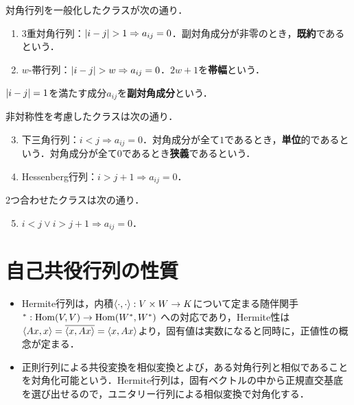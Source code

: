\documentclass[uplatex, dvipdfmx]{jsreport}
\begin{document}
\begin{definition}
    対角行列を一般化したクラスが次の通り．
    \begin{enumerate}
        \item 3重対角行列：$\lvert i-j\rvert>1\Rightarrow a_{ij}=0$．副対角成分が非零のとき，\textbf{既約}であるという．
        \item $w$-帯行列：$\lvert i-j\rvert>w\Rightarrow a_{ij}=0$．$2w+1$を\textbf{帯幅}という．
    \end{enumerate}
    $\lvert i-j\rvert=1$を満たす成分$a_{ij}$を\textbf{副対角成分}という．

    非対称性を考慮したクラスは次の通り．
    \begin{enumerate}\setcounter{enumi}{2}
        \item 下三角行列：$i<j\Rightarrow a_{ij}=0$．対角成分が全て$1$であるとき，\textbf{単位}的であるという．対角成分が全て$0$であるとき\textbf{狭義}であるという．
        \item Hessenberg行列：$i>j+1\Rightarrow a_{ij}=0$．
    \end{enumerate}
    2つ合わせたクラスは次の通り．
    \begin{enumerate}\setcounter{enumi}{4}
        \item $i<j\lor i>j+1\Rightarrow a_{ij}=0$．
    \end{enumerate}
\end{definition}

\section{自己共役行列の性質}

\begin{tcolorbox}[colframe=ForestGreen, colback=ForestGreen!10!white,breakable,colbacktitle=ForestGreen!40!white,coltitle=black,fonttitle=\bfseries\sffamily,
title=]
    \begin{itemize}
        \item Hermite行列は，内積$\langle\cdot,\cdot\rangle:V\times W\to K$について定まる随伴関手${}^*:\mathrm{Hom}(V,V)\to\mathrm{Hom}(W^*,W^*)$
        への対応であり，Hermite性は$\langle Ax,x\rangle=\overline{\langle x,Ax\rangle}=\langle x,Ax\rangle$より，固有値は実数になると同時に，正値性の概念が定まる．
        \item 正則行列による共役変換を相似変換とよび，ある対角行列と相似であることを対角化可能という．Hermite行列は，固有ベクトルの中から正規直交基底を選び出せるので，ユニタリー行列による相似変換で対角化する．
    \end{itemize}
\end{tcolorbox}
\end{document}
